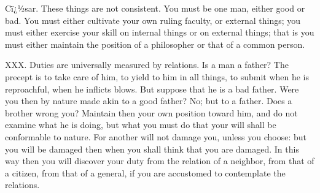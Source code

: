 Cï¿½sar. These things are not consistent. You must be one man, either good or bad. You must either cultivate your own ruling faculty, or external things; you must either exercise your skill on internal things or on external things; that is you must either maintain the position of a philosopher or that of a common person.



XXX. Duties are universally measured by relations. Is a man a father? The precept is to take care of him, to yield to him in all things, to submit when he is reproachful, when he inflicts blows. But suppose that he is a bad father. Were you then by nature made akin to a good father? No; but to a father. Does a brother wrong you? Maintain then your own position toward him, and do not examine what he is doing, but what you must do that your will shall be conformable to nature. For another will not damage you, unless you choose: but you will be damaged then when you shall think that you are damaged. In this way then you will discover your duty from the relation of a neighbor, from that of a citizen, from that of a general, if you are accustomed to contemplate the relations.




